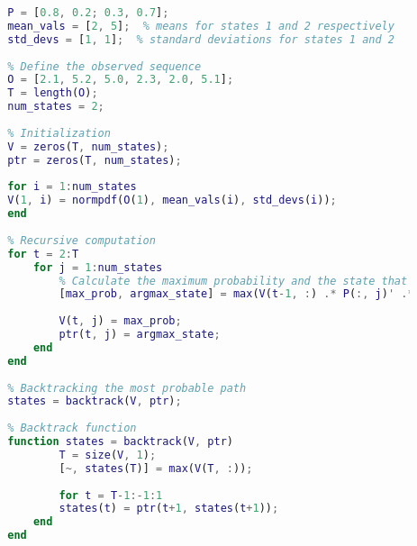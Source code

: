 \documentclass[UTF8,12pt]{ctexart}
\numberwithin{equation}{section}%
\begin{document}
	\begin{lstlisting}[language=Matlab, caption=The Matlab code of Markov, label=matlabcode,]
		% Define the state transition probability matrix and observation matrices
		P = [0.8, 0.2; 0.3, 0.7];
		mean_vals = [2, 5];  % means for states 1 and 2 respectively
		std_devs = [1, 1];  % standard deviations for states 1 and 2
		
		% Define the observed sequence
		O = [2.1, 5.2, 5.0, 2.3, 2.0, 5.1];
		T = length(O);
		num_states = 2;
		
		% Initialization
		V = zeros(T, num_states);
		ptr = zeros(T, num_states);
		
		for i = 1:num_states
		V(1, i) = normpdf(O(1), mean_vals(i), std_devs(i));
		end
		
		% Recursive computation
		for t = 2:T
			for j = 1:num_states
				% Calculate the maximum probability and the state that resulted in this max probability
				[max_prob, argmax_state] = max(V(t-1, :) .* P(:, j)' .* normpdf(O(t), mean_vals(j), std_devs(j)));
				
				V(t, j) = max_prob;
				ptr(t, j) = argmax_state;
			end
		end
		
		% Backtracking the most probable path
		states = backtrack(V, ptr);
		
		% Backtrack function
		function states = backtrack(V, ptr)
				T = size(V, 1);
				[~, states(T)] = max(V(T, :));
				
				for t = T-1:-1:1
				states(t) = ptr(t+1, states(t+1));
			end
		end
		
	\end{lstlisting}
	
	
	\newpage
\end{document}
